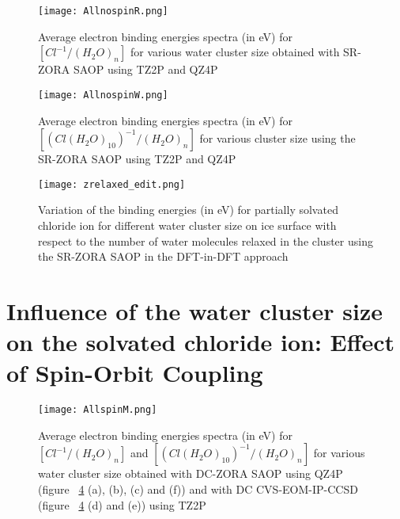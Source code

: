 \documentclass[a4paper,11pt]{report}
\begin{document}
\begin{figure}[H]\large
\captionsetup{font=footnotesize}
\texttt{[image: AllnospinR.png]}
\caption{Average electron binding energies spectra (in eV) for $[Cl^{-1}/(H_{2}O)_{n}]$ for various water cluster size obtained with SR-ZORA SAOP using TZ2P and QZ4P}
\label{figure53}
\end{figure}

\begin{figure}[H]\large
\captionsetup{font=footnotesize}
\texttt{[image: AllnospinW.png]}
\caption{Average electron binding energies spectra (in eV) for $[(Cl(H_{2}O)_{10})^{-1}/(H_{2}O)_{n}]$ for various cluster size using the SR-ZORA SAOP using TZ2P and QZ4P}
\label{figure54}
\end{figure}


\begin{figure}[H]\large
\captionsetup{font=footnotesize}
\texttt{[image: zrelaxed\_edit.png]}
\caption{Variation of the binding energies (in eV) for partially solvated chloride ion for different water cluster size on ice surface with respect to the number of water molecules relaxed in the cluster using the SR-ZORA SAOP in the DFT-in-DFT approach}
\label{figure45}
\end{figure}


\section{Influence of the water cluster size on the solvated chloride ion: Effect of Spin-Orbit Coupling}


\begin{figure}[H]\large
\captionsetup{font=footnotesize}
\texttt{[image: AllspinM.png]}
\caption{Average electron binding energies spectra (in eV) for $[Cl^{-1}/(H_{2}O)_{n}]$ and $[(Cl(H_{2}O)_{10})^{-1}/(H_{2}O)_{n}]$ for various water cluster size obtained with DC-ZORA SAOP using QZ4P (figure ~\ref{figure48} (a), (b), (c) and (f)) and with DC CVS-EOM-IP-CCSD (figure ~\ref{figure48} (d) and (e)) using TZ2P}
\label{figure48}
\end{figure}
\end{document}
